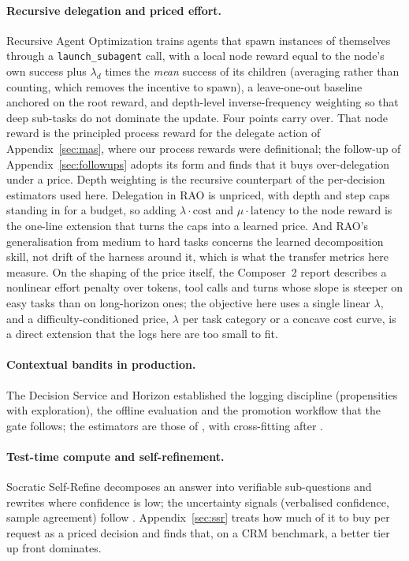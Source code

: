 \documentclass[10pt]{article}
\begin{document}
\paragraph{Recursive delegation and priced effort.} Recursive Agent Optimization \citep{rao2026} trains agents that spawn instances of themselves through a \texttt{launch\_subagent} call, with a local node reward equal to the node's own success plus $\lambda_d$ times the \emph{mean} success of its children (averaging rather than counting, which removes the incentive to spawn), a leave-one-out baseline anchored on the root reward, and depth-level inverse-frequency weighting so that deep sub-tasks do not dominate the update. Four points carry over. That node reward is the principled process reward for the delegate action of Appendix~\ref{sec:mas}, where our process rewards were definitional; the follow-up of Appendix~\ref{sec:followups} adopts its form and finds that it buys over-delegation under a price. Depth weighting is the recursive counterpart of the per-decision estimators used here. Delegation in RAO is unpriced, with depth and step caps standing in for a budget, so adding $\lambda\cdot\mathrm{cost}$ and $\mu\cdot\mathrm{latency}$ to the node reward is the one-line extension that turns the caps into a learned price. And RAO's generalisation from medium to hard tasks concerns the learned decomposition skill, not drift of the harness around it, which is what the transfer metrics here measure. On the shaping of the price itself, the Composer~2 report describes a nonlinear effort penalty over tokens, tool calls and turns whose slope is steeper on easy tasks than on long-horizon ones; the objective here uses a single linear $\lambda$, and a difficulty-conditioned price, $\lambda$ per task category or a concave cost curve, is a direct extension that the logs here are too small to fit.

\paragraph{Contextual bandits in production.} The Decision Service \citep{agarwal2016decisionservice} and Horizon \citep{gauci2018horizon} established the logging discipline (propensities with exploration), the offline evaluation \citep{li2011unbiased,bottou2013counterfactual} and the promotion workflow that the gate follows; the estimators are those of \citet{dudik2011dr,jiang2016dr,thomas2016magic,swaminathan2015snips}, with cross-fitting after \citet{chernozhukov2018dml}.

\paragraph{Test-time compute and self-refinement.} Socratic Self-Refine \citep{ssr2025} decomposes an answer into verifiable sub-questions and rewrites where confidence is low; the uncertainty signals (verbalised confidence, sample agreement) follow \citet{verbalizedconf2025}. Appendix~\ref{sec:ssr} treats how much of it to buy per request as a priced decision and finds that, on a CRM benchmark, a better tier up front dominates.
\end{document}
